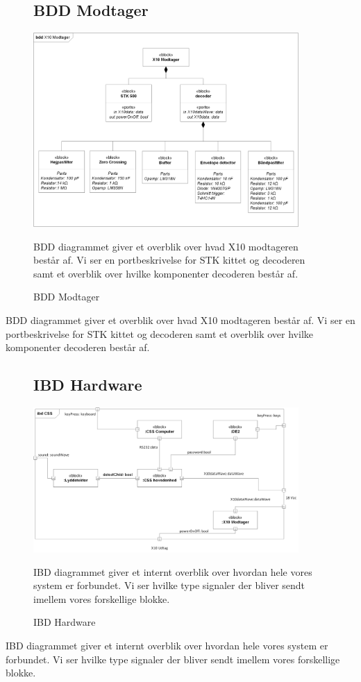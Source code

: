 \begin{figure}[!htbp] \centering
\subsection{BDD Modtager}
{\includegraphics[width=0.9\textwidth]{billeder/diagrammer/BDD_Modtager}}
\caption{BDD Modtager}
\label{lab:bddmodtager}
\raggedright
BDD diagrammet giver et overblik over hvad X10 modtageren består af. Vi ser en portbeskrivelse for STK kittet og decoderen samt et overblik over hvilke komponenter decoderen består af.
\end{figure}
BDD diagrammet giver et overblik over hvad X10 modtageren består af. Vi ser en portbeskrivelse for STK kittet og decoderen samt et overblik over hvilke komponenter decoderen består af.

\begin{figure}[!htbp] \centering
\subsection{IBD Hardware}
{\includegraphics[width=0.9\textwidth]{billeder/diagrammer/IBD_Hardware}}
\caption{IBD Hardware}
\label{lab:ibdhardware}
\raggedright
IBD diagrammet giver et internt overblik over hvordan hele vores system er forbundet. Vi ser hvilke type signaler der bliver sendt imellem vores forskellige blokke.
\end{figure}
IBD diagrammet giver et internt overblik over hvordan hele vores system er forbundet. Vi ser hvilke type signaler der bliver sendt imellem vores forskellige blokke.

